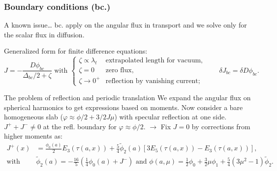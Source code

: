 \documentclass[black]{slideCEA}
\begin{document}
\begin{frame}
  \frametitle{Boundary conditions (bc.)}

  \begin{alertblock}{A known issue\ldots}
    bc. apply on the angular flux in transport and we solve only for the scalar flux in diffusion.
  \end{alertblock}
  { Generalized form for finite difference equations:
  \[
    J = - \frac{D \phi_{bc}}{\Delta_{bc} / 2 + \zeta} \text{ with }
    \begin{cases}
      \zeta \propto \lambda_t & \text{extrapolated length for vacuum}, \\
      \zeta = 0 & \text{zero flux}, \\
      \zeta \rightarrow 0^+ & \text{reflection by vanishing current};
    \end{cases} \qquad \delta J_{bc} = \delta D \phi_{bc}.
  \]
  }\vspace{-10mm}


  \begin{block}{The problem of reflection and periodic translation}
    We expand the angular flux on spherical harmonics to get expressions based
    on moments. Now consider a bare homogeneous slab
    ($\varphi \approx \phi/2 + 3/2 J \mu$) with specular reflection at one side.
    \alert<3>{$J^+ + J^- \neq 0$} at the refl. boundary for $\varphi \approx \phi/2$.
    {
      $\longrightarrow$ Fix $J=0$ by corrections from higher moments as:
      \begin{equation*}
      \begin{split}
      J^+(x) &= \frac{\phi_0(a)}{2}E_3(\tau(a, x)) + \frac{5}{4} \tilde{\phi}_2(a) \left[ 3 E_5(\tau(a, x)) - E_3(\tau(a, x)) \right],\\
             \text{with }& \tilde{\phi}_2(a) = - \frac{16}{5} \left( \frac{1}{4} \phi_0(a) + J^- \right) \text{ and }
      \phi(a, \mu) = \frac{1}{2} \phi_0 + \frac{3}{2} \mu \phi_1 + \frac{5}{4} \left( 3 \mu^2 - 1 \right) \tilde{\phi}_2.
      \end{split}
      \end{equation*}
    }
  \end{block}
\end{frame}
\end{document}
